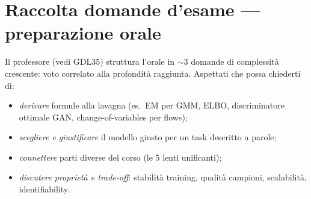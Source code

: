\chapter{Raccolta domande d'esame — preparazione orale}
\label{ch:exam-questions}

Il professore (vedi GDL35) struttura l'orale in $\sim$3 domande di complessità crescente: voto correlato alla profondità raggiunta. Aspettati che possa chiederti di:
\begin{itemize}
  \item \emph{derivare} formule alla lavagna (es.\ EM per GMM, ELBO, discriminatore ottimale GAN, change-of-variables per flows);
  \item \emph{scegliere e giustificare} il modello giusto per un task descritto a parole;
  \item \emph{connettere} parti diverse del corso (le 5 lenti unificanti);
  \item \emph{discutere proprietà e trade-off}: stabilità training, qualità campioni, scalabilità, identifiability.
\end{itemize}

